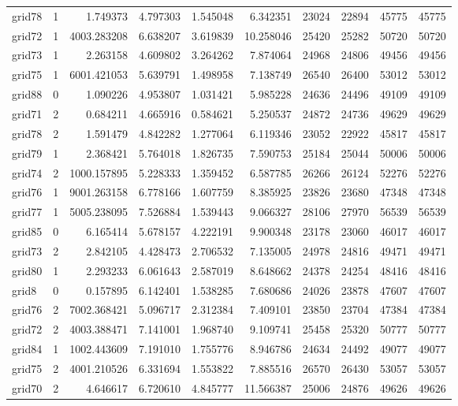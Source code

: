\begin{longtable}{|l|r|r|r|r|r|r|r|r|r|}
grid78 & 1 & 1.749373 & 4.797303 & 1.545048 & 6.342351 & 23024 & 22894 & 45775 & 45775 \\
grid72 & 1 & 4003.283208 & 6.638207 & 3.619839 & 10.258046 & 25420 & 25282 & 50720 & 50720 \\
grid73 & 1 & 2.263158 & 4.609802 & 3.264262 & 7.874064 & 24968 & 24806 & 49456 & 49456 \\
grid75 & 1 & 6001.421053 & 5.639791 & 1.498958 & 7.138749 & 26540 & 26400 & 53012 & 53012 \\
grid88 & 0 & 1.090226 & 4.953807 & 1.031421 & 5.985228 & 24636 & 24496 & 49109 & 49109 \\
grid71 & 2 & 0.684211 & 4.665916 & 0.584621 & 5.250537 & 24872 & 24736 & 49629 & 49629 \\
grid78 & 2 & 1.591479 & 4.842282 & 1.277064 & 6.119346 & 23052 & 22922 & 45817 & 45817 \\
grid79 & 1 & 2.368421 & 5.764018 & 1.826735 & 7.590753 & 25184 & 25044 & 50006 & 50006 \\
grid74 & 2 & 1000.157895 & 5.228333 & 1.359452 & 6.587785 & 26266 & 26124 & 52276 & 52276 \\
grid76 & 1 & 9001.263158 & 6.778166 & 1.607759 & 8.385925 & 23826 & 23680 & 47348 & 47348 \\
grid77 & 1 & 5005.238095 & 7.526884 & 1.539443 & 9.066327 & 28106 & 27970 & 56539 & 56539 \\
grid85 & 0 & 6.165414 & 5.678157 & 4.222191 & 9.900348 & 23178 & 23060 & 46017 & 46017 \\
grid73 & 2 & 2.842105 & 4.428473 & 2.706532 & 7.135005 & 24978 & 24816 & 49471 & 49471 \\
grid80 & 1 & 2.293233 & 6.061643 & 2.587019 & 8.648662 & 24378 & 24254 & 48416 & 48416 \\
grid8 & 0 & 0.157895 & 6.142401 & 1.538285 & 7.680686 & 24026 & 23878 & 47607 & 47607 \\
grid76 & 2 & 7002.368421 & 5.096717 & 2.312384 & 7.409101 & 23850 & 23704 & 47384 & 47384 \\
grid72 & 2 & 4003.388471 & 7.141001 & 1.968740 & 9.109741 & 25458 & 25320 & 50777 & 50777 \\
grid84 & 1 & 1002.443609 & 7.191010 & 1.755776 & 8.946786 & 24634 & 24492 & 49077 & 49077 \\
grid75 & 2 & 4001.210526 & 6.331694 & 1.553822 & 7.885516 & 26570 & 26430 & 53057 & 53057 \\
grid70 & 2 & 4.646617 & 6.720610 & 4.845777 & 11.566387 & 25006 & 24876 & 49626 & 49626 \\

\end{longtable}
